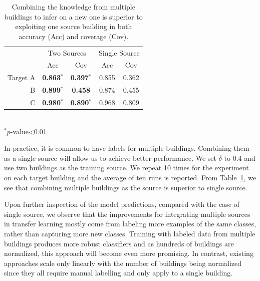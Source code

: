 \begin{table}[h]
\centering
\begin{tabular}{r|cc|cc}
\hline
\multirow{2}{*}{} & \multicolumn{2}{c|}{Two Sources} & \multicolumn{2}{c}{Single Source} \\ \cline{2-5}
 & Acc & Cov & Acc & Cov \\ \hline\hline
Target A & {\bf 0.863$^\ast$} & {\bf 0.397$^\ast$} & 0.855 & 0.362 \\ \hline
B & {\bf 0.899$^\ast$} & {\bf 0.458} & 0.874 & 0.455 \\ \hline
C & {\bf 0.980$^\ast$} & {\bf 0.890$^\ast$} & 0.968 & 0.809 \\ \hline
\end{tabular}
\\\noindent
$^\ast p$-value<0.01
\caption{Combining the knowledge from multiple buildings to infer on a new one is superior to exploiting one source building in both accuracy (Acc) and coverage (Cov).}
\label{2source}
\end{table}

In practice, it is common to have labels for multiple buildings. Combining them as a single source will allow us to achieve better performance. We set $\delta$ to 0.4 and use two buildings as the training source. %
We repeat 10 times for the experiment on each target building and the average of ten runs is reported.
From Table~\ref{2source}, we see that combining multiple buildings as the source is superior to single source.  %

Upon further inspection of the model predictions, compared with the case of single source, we observe that the improvements for integrating multiple sources in transfer learning mostly come from labeling more examples of the same classes, rather than capturing more new classes.
Training with labeled data from multiple buildings produces more robust classifiers and as hundreds of buildings are normalized, this approach will become even more promising.
In contrast, existing approaches scale only linearly with the number of buildings being normalized since they all require manual labelling and only apply to a single building.


